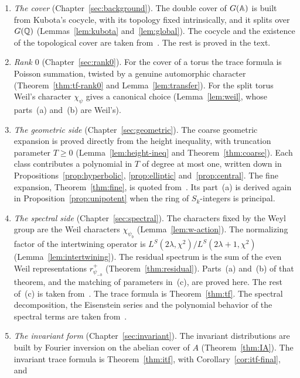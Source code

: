 \begin{enumerate}[label=\arabic*.]
\item \emph{The cover} (Chapter~\ref{sec:background}). The double cover
  of $G(\mathbb{A})$ is built from Kubota's cocycle, with its topology fixed
  intrinsically, and it splits over $G(\mathbb{Q})$ (Lemmas~\ref{lem:kubota}
  and~\ref{lem:global}). The cocycle and the existence of the topological
  cover are taken from~\cite{Ku67,Mo68}. The rest is proved in the text.
\item \emph{Rank $0$} (Chapter~\ref{sec:rank0}). For the cover of a torus
  the trace formula is Poisson summation, twisted by a genuine
  automorphic character (Theorem~\ref{thm:tf-rank0} and
  Lemma~\ref{lem:transfer}). For the split torus Weil's character
  $\chi_\psi$ gives a canonical choice (Lemma~\ref{lem:weil}, whose
  parts~(a) and~(b) are Weil's).
\item \emph{The geometric side} (Chapter~\ref{sec:geometric}). The coarse
  geometric expansion is proved directly from the height inequality, with
  truncation parameter $T\ge0$ (Lemma~\ref{lem:height-ineq} and
  Theorem~\ref{thm:coarse}). Each class contributes a polynomial in $T$ of
  degree at most one, written down in
  Propositions~\ref{prop:hyperbolic}, \ref{prop:elliptic}
  and~\ref{prop:central}. The fine expansion, Theorem~\ref{thm:fine}, is
  quoted from~\cite{Ar86,Li14a}. Its part~(a) is derived again in
  Proposition~\ref{prop:unipotent} when the ring of $S_k$-integers is
  principal.
\item \emph{The spectral side} (Chapter~\ref{sec:spectral}). The
  characters fixed by the Weyl group are the Weil characters
  $\chi_{\psi_b}$ (Lemma~\ref{lem:w-action}). The normalizing factor of the
  intertwining operator is $L^S(2\lambda,\chi^2)/L^S(2\lambda+1,\chi^2)$
  (Lemma~\ref{lem:intertwining}). The residual spectrum is the sum of the
  even Weil representations $r^+_{\psi_{-b}}$ (Theorem~\ref{thm:residual}).
  Parts~(a) and~(b) of that theorem, and the matching of parameters
  in~(c), are proved here. The rest of~(c) is taken
  from~\cite{Ge76,GPS80,Wa80}. The trace formula is
  Theorem~\ref{thm:tf}. The spectral decomposition, the Eisenstein series
  and the polynomial behavior of the spectral terms are taken
  from~\cite{La76,MW95,Ar80,Li13}.
\item \emph{The invariant form} (Chapter~\ref{sec:invariant}). The
  invariant distributions are built by Fourier inversion on the abelian
  cover of $A$ (Theorem~\ref{thm:IA}). The invariant trace formula is
  Theorem~\ref{thm:itf}, with Corollary~\ref{cor:itf-final}, and

\end{enumerate}
